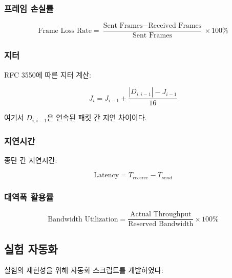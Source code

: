 \documentclass[twocolumn,10pt]{article}
\begin{document}
\subsubsection{프레임 손실률}

\begin{equation}
\text{Frame Loss Rate} = \frac{\text{Sent Frames} - \text{Received Frames}}{\text{Sent Frames}} \times 100\%
\end{equation}

\subsubsection{지터}

RFC 3550에 따른 지터 계산:

\begin{equation}
J_i = J_{i-1} + \frac{|D_{i,i-1}| - J_{i-1}}{16}
\end{equation}

여기서 $D_{i,i-1}$은 연속된 패킷 간 지연 차이이다.

\subsubsection{지연시간}

종단 간 지연시간:

\begin{equation}
\text{Latency} = T_{receive} - T_{send}
\end{equation}

\subsubsection{대역폭 활용률}

\begin{equation}
\text{Bandwidth Utilization} = \frac{\text{Actual Throughput}}{\text{Reserved Bandwidth}} \times 100\%
\end{equation}

\subsection{실험 자동화}

실험의 재현성을 위해 자동화 스크립트를 개발하였다:
\end{document}
